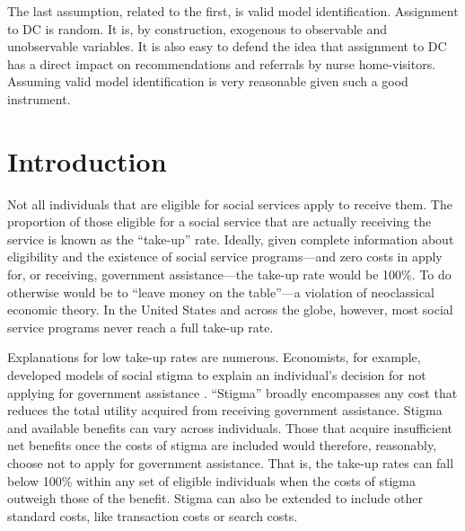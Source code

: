 \documentclass[12pt,letterpaperpaper,]{book}
\begin{document}
The last assumption, related to the first, is valid model
identification. Assignment to DC is random. It is, by construction,
exogenous to observable and unobservable variables. It is also easy to
defend the idea that assignment to DC has a direct impact on
recommendations and referrals by nurse home-visitors. Assuming valid
model identification is very reasonable given such a good instrument.

\section*{Introduction}\label{intro-2}

Not all individuals that are eligible for social services apply to
receive them. The proportion of those eligible for a social service that
are actually receiving the service is known as the ``take-up'' rate.
Ideally, given complete information about eligibility and the existence
of social service programs---and zero costs in apply for, or receiving,
government assistance---the take-up rate would be 100\%. To do otherwise
would be to ``leave money on the table''---a violation of neoclassical
economic theory. In the United States and across the globe, however,
most social service programs never reach a full take-up rate.

Explanations for low take-up rates are numerous. Economists, for
example, developed models of social stigma to explain an individual's
decision for not applying for government assistance
\citep{moffitt_economic_1983}. ``Stigma'' broadly encompasses any cost
that reduces the total utility acquired from receiving government
assistance. Stigma and available benefits can vary across individuals.
Those that acquire insufficient net benefits once the costs of stigma
are included would therefore, reasonably, choose not to apply for
government assistance. That is, the take-up rates can fall below 100\%
within any set of eligible individuals when the costs of stigma outweigh
those of the benefit. Stigma can also be extended to include other
standard costs, like transaction costs or search costs.
\end{document}
